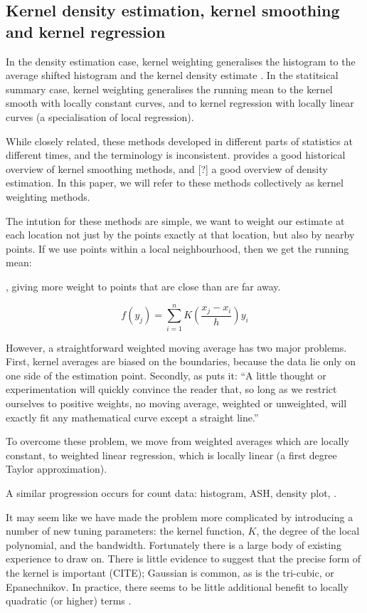 \documentclass[journal]{vgtc}                %
\begin{document}
\subsection{Kernel density estimation, kernel smoothing and kernel regression}

In the density estimation case, kernel weighting generalises the histogram to the average shifted histogram \citep{scott:1985} and the kernel density estimate \citep{scott:1992}. In the statitsical summary case, kernel weighting generalises the running mean to the kernel smooth with locally constant curves, and to kernel regression with locally linear curves (a specialisation of local regression).

While closely related, these methods developed in different parts of statistics at different times, and the terminology is inconsistent. \citep{cleveland:1996} provides a good historical overview of kernel smoothing methods, and [?] a good overview of density estimation. In this paper, we will refer to these methods collectively as kernel weighting methods.

The intution for these methods are simple, we want to weight our estimate at each location not just by the points exactly at that location, but also by nearby points. If we use points within a local neighbourhood, then we get the running mean:


, giving more weight to points that are close than are far away.  

\[
  f(y_j) = \sum_{i = 1}^n K( \frac{x_j - x_i}{h} ) y_i 
\]

However, a straightforward weighted moving average has two major problems. First, kernel averages are biased on the boundaries, because the data lie only on one side of the estimation point.  Secondly, as \citep{macaulay:1931} puts it: ``A little thought or experimentation will quickly convince the reader that, so long as we restrict ourselves to positive weights, no moving average, weighted or unweighted, will exactly fit any mathematical curve except a straight line.''

To overcome these problem, we move from weighted averages which are locally constant, to weighted linear regression, which is locally linear (a first degree Taylor approximation).  

A similar progression occurs for count data: histogram, ASH, density plot, .

It may seem like we have made the problem more complicated by introducing a number of new tuning parameters: the kernel function, $K$, the degree of the local polynomial, and the bandwidth. Fortunately there is a large body of existing experience to draw on. There is little evidence to suggest that the precise form of the kernel is important (CITE); Gaussian is common, as is the tri-cubic, or Epanechnikov. In practice, there seems to be little additional benefit to locally quadratic (or higher) terms \citep{cleveland:1996}.
\end{document}
